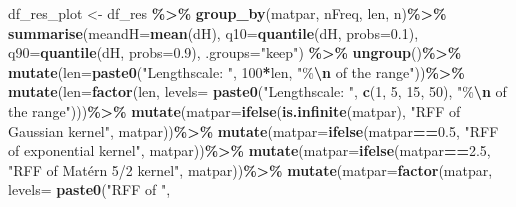 \documentclass[
]{article}
\newenvironment{Shaded}{\begin{snugshade}}{\end{snugshade}}
\newcommand{\AttributeTok}[1]{\textcolor[rgb]{0.13,0.29,0.53}{#1}}
\newcommand{\DecValTok}[1]{\textcolor[rgb]{0.00,0.00,0.81}{#1}}
\newcommand{\FloatTok}[1]{\textcolor[rgb]{0.00,0.00,0.81}{#1}}
\newcommand{\FunctionTok}[1]{\textcolor[rgb]{0.13,0.29,0.53}{\textbf{#1}}}
\newcommand{\NormalTok}[1]{#1}
\newcommand{\OtherTok}[1]{\textcolor[rgb]{0.56,0.35,0.01}{#1}}
\newcommand{\SpecialCharTok}[1]{\textcolor[rgb]{0.81,0.36,0.00}{\textbf{#1}}}
\newcommand{\StringTok}[1]{\textcolor[rgb]{0.31,0.60,0.02}{#1}}
\begin{document}
\begin{Shaded}
\begin{Highlighting}[]
\NormalTok{df\_res\_plot }\OtherTok{\textless{}{-}}\NormalTok{ df\_res }\SpecialCharTok{\%\textgreater{}\%}
  \FunctionTok{group\_by}\NormalTok{(matpar, nFreq, len, n)}\SpecialCharTok{\%\textgreater{}\%}
  \FunctionTok{summarise}\NormalTok{(}\AttributeTok{meandH=}\FunctionTok{mean}\NormalTok{(dH),}
            \AttributeTok{q10=}\FunctionTok{quantile}\NormalTok{(dH, }\AttributeTok{probs=}\FloatTok{0.1}\NormalTok{),}
            \AttributeTok{q90=}\FunctionTok{quantile}\NormalTok{(dH, }\AttributeTok{probs=}\FloatTok{0.9}\NormalTok{), }\AttributeTok{.groups=}\StringTok{"keep"}\NormalTok{) }\SpecialCharTok{\%\textgreater{}\%}
  \FunctionTok{ungroup}\NormalTok{()}\SpecialCharTok{\%\textgreater{}\%}
  \FunctionTok{mutate}\NormalTok{(}\AttributeTok{len=}\FunctionTok{paste0}\NormalTok{(}\StringTok{"Lengthscale: "}\NormalTok{, }\DecValTok{100}\SpecialCharTok{*}\NormalTok{len,}
                    \StringTok{"\%}\SpecialCharTok{\textbackslash{}n}\StringTok{ of the range"}\NormalTok{))}\SpecialCharTok{\%\textgreater{}\%}
  \FunctionTok{mutate}\NormalTok{(}\AttributeTok{len=}\FunctionTok{factor}\NormalTok{(len, }\AttributeTok{levels=} \FunctionTok{paste0}\NormalTok{(}\StringTok{"Lengthscale: "}\NormalTok{, }
                                        \FunctionTok{c}\NormalTok{(}\DecValTok{1}\NormalTok{, }\DecValTok{5}\NormalTok{, }\DecValTok{15}\NormalTok{, }\DecValTok{50}\NormalTok{),}
                                        \StringTok{"\%}\SpecialCharTok{\textbackslash{}n}\StringTok{ of the range"}\NormalTok{)))}\SpecialCharTok{\%\textgreater{}\%}
  \FunctionTok{mutate}\NormalTok{(}\AttributeTok{matpar=}\FunctionTok{ifelse}\NormalTok{(}\FunctionTok{is.infinite}\NormalTok{(matpar), }
                       \StringTok{"RFF of Gaussian kernel"}\NormalTok{, }
\NormalTok{                       matpar))}\SpecialCharTok{\%\textgreater{}\%}
  \FunctionTok{mutate}\NormalTok{(}\AttributeTok{matpar=}\FunctionTok{ifelse}\NormalTok{(matpar}\SpecialCharTok{==}\FloatTok{0.5}\NormalTok{, }
                       \StringTok{"RFF of exponential kernel"}\NormalTok{, }
\NormalTok{                       matpar))}\SpecialCharTok{\%\textgreater{}\%}
  \FunctionTok{mutate}\NormalTok{(}\AttributeTok{matpar=}\FunctionTok{ifelse}\NormalTok{(matpar}\SpecialCharTok{==}\FloatTok{2.5}\NormalTok{, }
                       \StringTok{"RFF of Matérn 5/2 kernel"}\NormalTok{, }
\NormalTok{                       matpar))}\SpecialCharTok{\%\textgreater{}\%}
  \FunctionTok{mutate}\NormalTok{(}\AttributeTok{matpar=}\FunctionTok{factor}\NormalTok{(matpar, }\AttributeTok{levels=} \FunctionTok{paste0}\NormalTok{(}\StringTok{"RFF of "}\NormalTok{,}

\end{Highlighting}
\end{Shaded}
\end{document}
